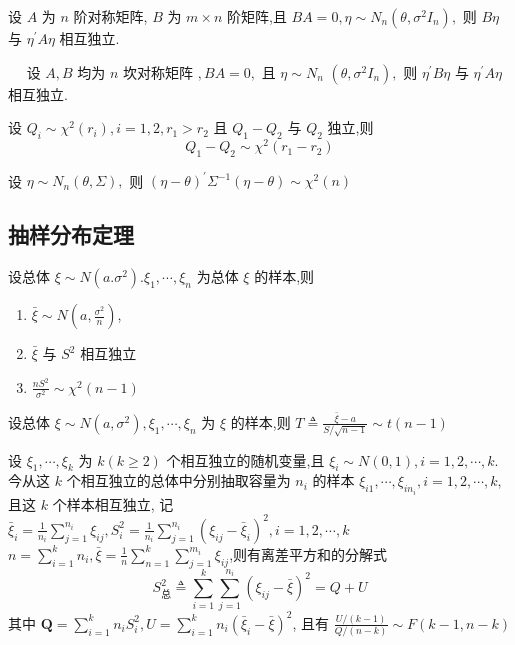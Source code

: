\documentclass[10pt]{yerbaformat}
\begin{document}
\begin{theorem}
    设 $A$ 为 $n$ 阶对称矩阵, $B$ 为 $m \times n$ 阶矩阵,且 $B A=0, \eta \sim N_{n}\left(\theta, \sigma^{2} I_{n}\right),$ 则 $B \eta$ 与 $\eta^{\prime} A \eta$ 相互独立.
\end{theorem}

\begin{theorem}
    $\quad$ 设 $A, B$ 均为 $n$ 坎对称矩阵 $, B A=0,$ 且 $\eta \sim N_{n}$ $\left(\theta, \sigma^{2} I_{n}\right),$ 则 $\eta^{\prime} B \eta$ 与 $\eta^{\prime} A \eta$ 相互独立.
\end{theorem}


\begin{theorem}
    设 $Q_{i} \sim \chi^{2}\left(r_{i}\right), i=1,2, r_{1}>r_{2}$ 且 $Q_{1}-Q_{2}$ 与
    $Q_{2}$ 独立,则
    $$
        Q_{1}-Q_{2} \sim \chi^{2}\left(r_{1}-r_{2}\right)
    $$
\end{theorem}

\begin{theorem}
    设 $\eta \sim N_{n}(\theta, \Sigma),$ 则 $(\eta-\theta)^{\prime} \Sigma^{-1}(\eta-\theta) \sim \chi^{2}(n)$
\end{theorem}

\subsection{抽样分布定理}
\begin{theorem}
    设总体 $\xi \sim N\left(a . \sigma^{2}\right) . \xi_{1}, \cdots, \xi_{n}$ 为总体 $\xi$ 的样本,则
    \begin{enumerate}
        \item $\bar{\xi} \sim N\left(a, \frac{\sigma^{2}}{n}\right)$,
        \item $\bar{\xi}$ 与 $S^{2}$ 相互独立
        \item $\frac{n S^{2}}{\sigma^{2}} \sim \chi^{2}(n-1)$
    \end{enumerate}
\end{theorem}

\begin{proposition}
    设总体 $\xi \sim N\left(a, \sigma^{2}\right), \xi_{1}, \cdots, \xi_{n}$ 为 $\xi$ 的样本,则
    $T \triangleq \frac{\bar{\xi}-a}{S / \sqrt{n-1}} \sim t(n-1)$
\end{proposition}

\begin{proposition}
    设 $\xi_{1}, \cdots, \xi_{k}$ 为 $k(k \geqslant 2)$ 个相互独立的随机变量,且 $\xi_{i} \sim N(0,1), i=1,2, \cdots, k .$ 今从这 $k$ 个相互独立的总体中分别抽取容量为 $n_{i}$ 的样本 $\xi_{i 1}, \cdots, \xi_{i n_{i}}, i=1,2, \cdots, k,$ 且这 $k$ 个样本相互独立, 记 $\bar{\xi}_{i}=\frac{1}{n_{i}} \sum_{j=1}^{n_{i}} \xi_{i j}, S_{i}^{2}=\frac{1}{n_{i}} \sum_{j=1}^{n_{i}}\left(\xi_{i j}-\bar{\xi}_{i}\right)^{2}, i=1,2, \cdots, k$
    $n=\sum_{i=1}^{k} n_{i}, \bar{\xi}=\frac{1}{n} \sum_{n=1}^{k} \sum_{j=1}^{m_{i}} \xi_{i j}$,则有离差平方和的分解式 $$S_{总}^{2} \triangleq \sum_{i=1}^{k} \sum_{j=1}^{n_{i}}\left(\xi_{i j}-\bar{\xi}\right)^{2}=Q+U$$ 其中 $\boldsymbol{Q}=\sum_{i=1}^{k} n_{i} S_{i}^{2}, U=\sum_{i=1}^{k} n_{i}\left(\bar{\xi}_{i}-\bar{\xi}\right)^{2}$, 且有 $\frac{U /(k-1)}{Q /(n-k)} \sim F(k-1, n-k)$
\end{proposition}
\end{document}
